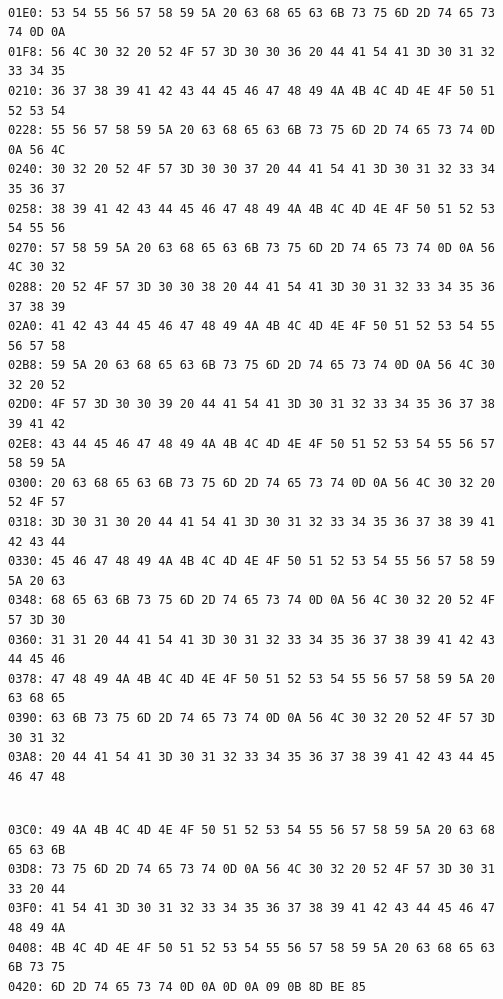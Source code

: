 \par\noindent\begin{minipage}{\linewidth}
\begin{lstlisting}[caption={帧18物理字节，偏移01E0--03BF}]

01E0: 53 54 55 56 57 58 59 5A 20 63 68 65 63 6B 73 75 6D 2D 74 65 73 74 0D 0A
01F8: 56 4C 30 32 20 52 4F 57 3D 30 30 36 20 44 41 54 41 3D 30 31 32 33 34 35
0210: 36 37 38 39 41 42 43 44 45 46 47 48 49 4A 4B 4C 4D 4E 4F 50 51 52 53 54
0228: 55 56 57 58 59 5A 20 63 68 65 63 6B 73 75 6D 2D 74 65 73 74 0D 0A 56 4C
0240: 30 32 20 52 4F 57 3D 30 30 37 20 44 41 54 41 3D 30 31 32 33 34 35 36 37
0258: 38 39 41 42 43 44 45 46 47 48 49 4A 4B 4C 4D 4E 4F 50 51 52 53 54 55 56
0270: 57 58 59 5A 20 63 68 65 63 6B 73 75 6D 2D 74 65 73 74 0D 0A 56 4C 30 32
0288: 20 52 4F 57 3D 30 30 38 20 44 41 54 41 3D 30 31 32 33 34 35 36 37 38 39
02A0: 41 42 43 44 45 46 47 48 49 4A 4B 4C 4D 4E 4F 50 51 52 53 54 55 56 57 58
02B8: 59 5A 20 63 68 65 63 6B 73 75 6D 2D 74 65 73 74 0D 0A 56 4C 30 32 20 52
02D0: 4F 57 3D 30 30 39 20 44 41 54 41 3D 30 31 32 33 34 35 36 37 38 39 41 42
02E8: 43 44 45 46 47 48 49 4A 4B 4C 4D 4E 4F 50 51 52 53 54 55 56 57 58 59 5A
0300: 20 63 68 65 63 6B 73 75 6D 2D 74 65 73 74 0D 0A 56 4C 30 32 20 52 4F 57
0318: 3D 30 31 30 20 44 41 54 41 3D 30 31 32 33 34 35 36 37 38 39 41 42 43 44
0330: 45 46 47 48 49 4A 4B 4C 4D 4E 4F 50 51 52 53 54 55 56 57 58 59 5A 20 63
0348: 68 65 63 6B 73 75 6D 2D 74 65 73 74 0D 0A 56 4C 30 32 20 52 4F 57 3D 30
0360: 31 31 20 44 41 54 41 3D 30 31 32 33 34 35 36 37 38 39 41 42 43 44 45 46
0378: 47 48 49 4A 4B 4C 4D 4E 4F 50 51 52 53 54 55 56 57 58 59 5A 20 63 68 65
0390: 63 6B 73 75 6D 2D 74 65 73 74 0D 0A 56 4C 30 32 20 52 4F 57 3D 30 31 32
03A8: 20 44 41 54 41 3D 30 31 32 33 34 35 36 37 38 39 41 42 43 44 45 46 47 48

\end{lstlisting}
\end{minipage}\par

\par\noindent\begin{minipage}{\linewidth}
\begin{lstlisting}[caption={帧18物理字节，偏移03C0--042E}]

03C0: 49 4A 4B 4C 4D 4E 4F 50 51 52 53 54 55 56 57 58 59 5A 20 63 68 65 63 6B
03D8: 73 75 6D 2D 74 65 73 74 0D 0A 56 4C 30 32 20 52 4F 57 3D 30 31 33 20 44
03F0: 41 54 41 3D 30 31 32 33 34 35 36 37 38 39 41 42 43 44 45 46 47 48 49 4A
0408: 4B 4C 4D 4E 4F 50 51 52 53 54 55 56 57 58 59 5A 20 63 68 65 63 6B 73 75
0420: 6D 2D 74 65 73 74 0D 0A 0D 0A 09 0B 8D BE 85

\end{lstlisting}
\end{minipage}\par

